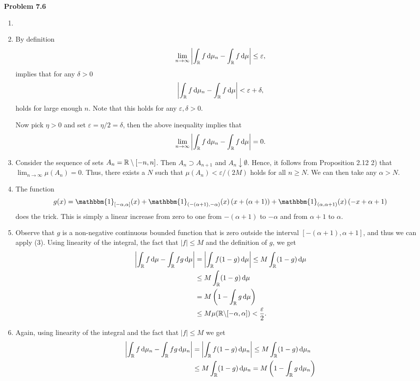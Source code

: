 \documentclass{lecturenotes}
\begin{document}
\textbf{Problem 7.6}

\begin{enumerate}[label={(\alph*)}]
\item 
\item By definition
\[
	\lim_{n\to\infty} \left|\int_{\mathbb R} f \, \mathrm{d} \mu_n - \int_{\mathbb R} f \, \mathrm{d} \mu\right| \le \varepsilon,
\]
implies that for any $\delta > 0$
\[
	\left|\int_{\mathbb R} f \, \mathrm{d} \mu_n - \int_{\mathbb R} f \, \mathrm{d} \mu\right| < \varepsilon + \delta,
\]
holds for large enough $n$. Note that this holds for any $\varepsilon, \delta > 0$.

Now pick $\eta > 0$ and set $\varepsilon = \eta/2 = \delta$, then the above inequality implies that
\[
	\lim_{n\to\infty} \left|\int_{\mathbb R} f \, \mathrm{d} \mu_n - \int_{\mathbb R} f \, \mathrm{d} \mu\right| = 0.
\]

\item Consider the sequence of sets $A_n = \mathbb R\setminus [-n,n]$. Then $A_n \supset A_{n + 1}$ and $A_n \downarrow \emptyset$. Hence, it follows from Proposition 2.12 2) that $\lim_{n \to \infty} \mu(A_n) = 0$. Thus, there exists a $N$ such that $\mu(A_n) < \varepsilon/(2M)$ holds for all $n \ge N$. We can then take any $\alpha > N$.
\item The function
\[
	g(x) = \mathbbm{1}_{[-\alpha,\alpha]}(x) + \mathbbm{1}_{(-(\alpha+1), -\alpha)}(x)\left(x + (\alpha + 1)\right) + \mathbbm{1}_{(\alpha,\alpha+1)}(x)\left(-x + \alpha + 1\right)
\]
does the trick. This is simply a linear increase from zero to one from $-(\alpha + 1)$ to $-\alpha$ and from $\alpha + 1$ to $\alpha$.
\item Observe that $g$ is a non-negative continuous bounded function that is zero outside the interval $[-(\alpha+1), \alpha+1]$, and thus we can apply (3).
Using linearity of the integral, the fact that $|f| \le M$ and the definition of $g$, we get
\begin{align*}
	\left|\int_{\mathbb R} f \, \mathrm{d} \mu - \int_{\mathbb R} fg \, \mathrm{d} \mu\right|
	&= \left|\int_{\mathbb R} f (1-g) \, \mathrm{d} \mu\right| \le M \int_{\mathbb R} (1-g) \, \mathrm{d} \mu \\
	&\le M \int_{\mathbb R} (1-g) \, \mathrm{d} \mu \\
	&= M\left(1-\int_{\mathbb R} g \, \mathrm{d} \mu\right) \\
	&\le  M \mu(\mathbb R \backslash [-\alpha,\alpha]) < \frac{\varepsilon}{2}.
\end{align*}
\item Again, using linearity of the integral and the fact that $|f| \le M$ we get
\begin{align*}
	\left|\int_{\mathbb R} f \, \mathrm{d} \mu_n - \int_{\mathbb R} fg \, \mathrm{d} \mu_n\right|
	&= \left|\int_{\mathbb R} f (1-g) \, \mathrm{d} \mu_n\right| \le M \int_{\mathbb R} (1-g) \, \mathrm{d} \mu_n \\
	&\le M \int_{\mathbb R} (1-g) \, \mathrm{d} \mu_n = M\left(1-\int_{\mathbb R} g \, \mathrm{d} \mu_n\right)
\end{align*}


\end{enumerate}
\end{document}

